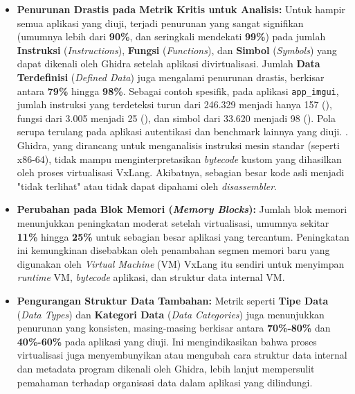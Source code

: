 \begin{itemize}
    \item \textbf{Penurunan Drastis pada Metrik Kritis untuk Analisis:}
    Untuk hampir semua aplikasi yang diuji, terjadi penurunan yang sangat signifikan (umumnya lebih dari \textbf{90\%}, dan seringkali mendekati \textbf{99\%}) pada jumlah \textbf{Instruksi} (\textit{Instructions}), \textbf{Fungsi} (\textit{Functions}), dan \textbf{Simbol} (\textit{Symbols}) yang dapat dikenali oleh Ghidra setelah aplikasi divirtualisasi. Jumlah \textbf{Data Terdefinisi} (\textit{Defined Data}) juga mengalami penurunan drastis, berkisar antara \textbf{79\%} hingga \textbf{98\%}.
    Sebagai contoh spesifik, pada aplikasi \texttt{app\_imgui}, jumlah instruksi yang terdeteksi turun dari 246.329 menjadi hanya 157 (), fungsi dari 3.005 menjadi 25 (), dan simbol dari 33.620 menjadi 98 (). Pola serupa terulang pada aplikasi autentikasi dan benchmark lainnya yang diuji.
    . Ghidra, yang dirancang untuk menganalisis instruksi mesin standar (seperti x86-64), tidak mampu menginterpretasikan \textit{bytecode} kustom yang dihasilkan oleh proses virtualisasi VxLang. Akibatnya, sebagian besar kode asli menjadi "tidak terlihat" atau tidak dapat dipahami oleh \textit{disassembler}.

    \item \textbf{Perubahan pada Blok Memori (\textit{Memory Blocks}):}
    Jumlah blok memori menunjukkan peningkatan moderat setelah virtualisasi, umumnya sekitar \textbf{11\%} hingga \textbf{25\%} untuk sebagian besar aplikasi yang tercantum. Peningkatan ini kemungkinan disebabkan oleh penambahan segmen memori baru yang digunakan oleh \textit{Virtual Machine} (VM) VxLang itu sendiri untuk menyimpan \textit{runtime} VM, \textit{bytecode} aplikasi, dan struktur data internal VM.

    \item \textbf{Pengurangan Struktur Data Tambahan:}
    Metrik seperti \textbf{Tipe Data} (\textit{Data Types}) dan \textbf{Kategori Data} (\textit{Data Categories}) juga menunjukkan penurunan yang konsisten, masing-masing berkisar antara \textbf{70\%-80\%} dan \textbf{40\%-60\%} pada aplikasi yang diuji. Ini mengindikasikan bahwa proses virtualisasi juga menyembunyikan atau mengubah cara struktur data internal dan metadata program dikenali oleh Ghidra, lebih lanjut mempersulit pemahaman terhadap organisasi data dalam aplikasi yang dilindungi.


\end{itemize}
